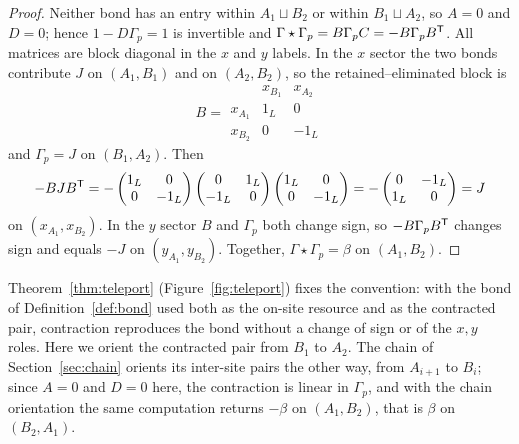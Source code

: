 \begin{proof}
Neither bond has an entry within $A_1\sqcup B_2$ or within $B_1\sqcup A_2$, so $A=0$
and $D=0$; hence $1-D\Gamma_p=1$ is invertible and
$\Gamma\star\Gamma_p=B\Gamma_pC=-B\Gamma_pB^{\mathsf T}$. All matrices are block diagonal in the
$x$ and $y$ labels. In the $x$ sector the two bonds contribute $J$ on $(A_1,B_1)$ and on
$(A_2,B_2)$, so the retained--eliminated block is
\[
 B=\begin{array}{c|cc}
    & x_{B_1} & x_{A_2}\\ \hline
  x_{A_1} & 1_L & 0\\
  x_{B_2} & 0 & -1_L
 \end{array}
\]
and $\Gamma_p=J$ on $(B_1,A_2)$. Then
\[
 -BJB^{\mathsf T}
 =-\begin{pmatrix}1_L&0\\0&-1_L\end{pmatrix}\begin{pmatrix}0&1_L\\-1_L&0\end{pmatrix}\begin{pmatrix}1_L&0\\0&-1_L\end{pmatrix}
 =-\begin{pmatrix}0&-1_L\\1_L&0\end{pmatrix}=J
\]
on $(x_{A_1},x_{B_2})$. In the $y$ sector $B$ and $\Gamma_p$ both change sign, so
$-B\Gamma_pB^{\mathsf T}$ changes sign and equals $-J$ on $(y_{A_1},y_{B_2})$. Together,
$\Gamma\star\Gamma_p=\beta$ on $(A_1,B_2)$.
\end{proof}
Theorem~\ref{thm:teleport} (Figure~\ref{fig:teleport}) fixes the convention: with the bond of
Definition~\ref{def:bond} used both as the on-site resource and as the contracted pair,
contraction reproduces the bond without a change of sign or of the $x,y$ roles. Here
we orient the contracted pair from $B_1$ to $A_2$. The chain of Section~\ref{sec:chain}
orients its inter-site pairs the other way, from $A_{i+1}$ to $B_i$; since $A=0$ and $D=0$
here, the contraction is linear in $\Gamma_p$, and with the chain orientation the same
computation returns $-\beta$ on $(A_1,B_2)$, that is $\beta$ on $(B_2,A_1)$.

